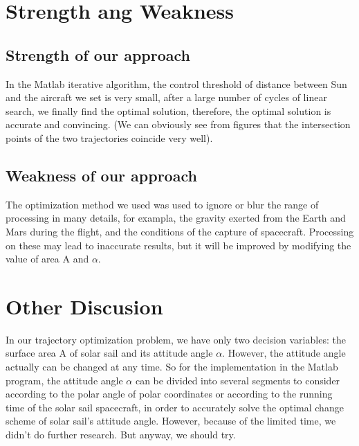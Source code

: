 \documentclass[../Paper.tex]{subfiles}
\begin{document}
\section{Strength ang Weakness}
\subsection{Strength of our approach}

In the Matlab iterative algorithm, the control threshold of distance between Sun and the aircraft we set is very small, after a large number of cycles of linear search, we finally find the optimal solution, therefore, the optimal solution is accurate and convincing. (We can obviously see from figures that the intersection points of the two trajectories coincide very well).

\subsection{Weakness of our approach}

The optimization method we used was used to ignore or blur the range of processing in many details, for exampla, the gravity exerted from the Earth and Mars during the flight, and the conditions of the capture of spacecraft. Processing on these may lead to inaccurate results, but it will be improved by modifying the value of area A and $\alpha$.

\section{Other Discusion}

In our trajectory optimization problem, we have only two decision variables: the surface area A of solar sail and its attitude angle $\alpha$. However, the attitude angle actually can be changed at any time. So for the implementation in the Matlab program, the attitude angle $\alpha$ can be divided into several segments to consider according to the polar angle of polar coordinates or according to the running time of the solar sail spacecraft, in order to accurately solve the optimal change scheme of solar sail's attitude angle. However, because of the limited time, we didn't do further research. But anyway, we should try.
\end{document}
